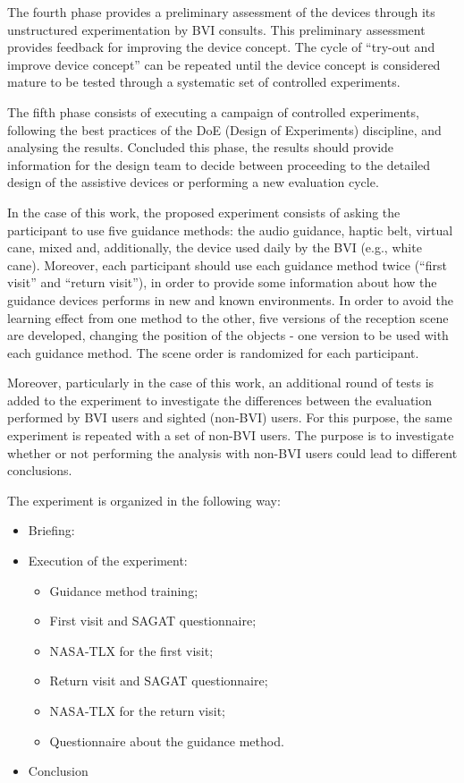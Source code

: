 The fourth phase provides a preliminary assessment of the devices through its unstructured experimentation by BVI consults. This preliminary assessment provides feedback for improving the device concept. The cycle of “try-out and improve device concept” can be repeated until the device concept is considered mature to be tested through a systematic set of controlled experiments.

The fifth phase consists of executing a campaign of controlled experiments, following the best practices of the DoE (Design of Experiments) discipline, and analysing the results. Concluded this phase, the results should provide information for the design team to decide between proceeding to the detailed design of the assistive devices or performing a new evaluation cycle.

In the case of this work, the proposed experiment consists of asking the participant to use five guidance methods: the audio guidance, haptic belt, virtual cane, mixed and, additionally, the device used daily by the BVI (e.g., white cane). Moreover, each participant should use each guidance method twice (“first visit” and “return visit”), in order to provide some information about how the guidance devices performs in new and known environments. In order to avoid the learning effect from one method to the other, five versions of the reception scene are developed, changing the position of the objects - one version to be used with each guidance method. The scene order is randomized for each participant.

Moreover, particularly in the case of this work, an additional round of tests is added to the experiment to investigate the differences between the evaluation performed by BVI users and sighted (non-BVI) users. For this purpose, the same experiment is repeated with a set of non-BVI users. The purpose is to investigate whether or not performing the analysis with non-BVI users could lead to different conclusions.

The experiment is organized in the following way:

\begin{itemize}
    \item Briefing:
    \item Execution of the experiment:
    \begin{itemize}
        \item Guidance method training;
        \item First visit and SAGAT questionnaire;
        \item NASA-TLX for the first visit;
        \item Return visit and SAGAT questionnaire;
        \item NASA-TLX for the return visit;
        \item Questionnaire about the guidance method.
    \end{itemize}
    \item Conclusion
\end{itemize}

